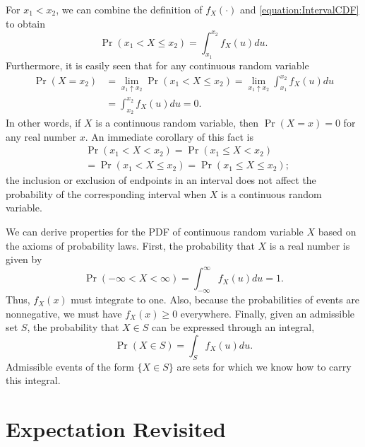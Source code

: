 For $x_1 < x_2$, we can combine the definition of $f_X(\cdot)$ and \eqref{equation:IntervalCDF} to obtain
\begin{equation*}
\Pr (x_1 < X \leq x_2) = \int_{x_1}^{x_2} f_X (u) du .
\end{equation*}
Furthermore, it is easily seen that for any continuous random variable
\begin{equation*}
\begin{split}
\Pr (X = x_2) &= \lim_{x_1 \uparrow x_2} \Pr (x_1 < X \leq x_2)
= \lim_{x_1 \uparrow x_2} \int_{x_1}^{x_2} f_X (u) du \\
&= \int_{x_2}^{x_2} f_X (u) du = 0.
\end{split}
\end{equation*}
In other words, if $X$ is a continuous random variable, then $\Pr (X = x) = 0$ for any real number $x$.
An immediate corollary of this fact is
\begin{equation*}
\begin{split}
&\Pr (x_1 < X < x_2)
= \Pr (x_1 \leq X < x_2) \\
&= \Pr (x_1 < X \leq x_2)
= \Pr (x_1 \leq X \leq x_2) ;
\end{split}
\end{equation*}
the inclusion or exclusion of endpoints in an interval does not affect the probability of the corresponding interval when $X$ is a continuous random variable.

We can derive properties for the PDF of continuous random variable $X$ based on the axioms of probability laws.
First, the probability that $X$ is a real number is given by
\begin{equation*}
\Pr (-\infty < X < \infty) = \int_{-\infty}^{\infty} f_X (u) du = 1.
\end{equation*}
Thus, $f_X (x)$ must integrate to one.
Also, because the probabilities of events are nonnegative, we must have $f_X (x) \geq 0$ everywhere.
Finally, given an admissible set $S$, the probability that $X \in S$ can be expressed through an integral,
\begin{equation*}
\Pr (X \in S) = \int_S f_X (u) du .
\end{equation*}
Admissible events of the form $\{ X \in S \}$ are sets for which we know how to carry this integral.


\section{Expectation Revisited}

